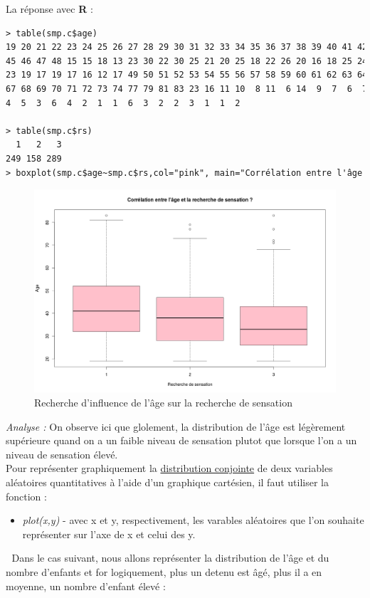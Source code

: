 La réponse avec \textbf{R} : 
\begin{lstlisting}[language=html]
> table(smp.c$age)
19 20 21 22 23 24 25 26 27 28 29 30 31 32 33 34 35 36 37 38 39 40 41 42 43 44 
45 46 47 48 15 15 18 13 23 30 22 30 25 21 20 25 18 22 26 20 16 18 25 24 23 22 
23 19 17 19 17 16 12 17 49 50 51 52 53 54 55 56 57 58 59 60 61 62 63 64 65 66 
67 68 69 70 71 72 73 74 77 79 81 83 23 16 11 10  8 11  6 14  9  7  6  7  5  7  
4  5  3  6  4  2  1  1  6  3  2  2  3  1  1  2 

> table(smp.c$rs)
  1   2   3 
249 158 289 
> boxplot(smp.c$age~smp.c$rs,col="pink", main="Corrélation entre l'âge et la recherche de sensation ?", xlab = "Recherche de sensation", ylab="Age")
\end{lstlisting}
\begin{figure}[H]\begin{center}\includegraphics[scale=0.35]{ilu/tp5.png}\caption{Recherche d'influence de l'âge sur la recherche de sensation}\end{center}\end{figure}
\textit{Analyse :} On observe ici que glolement, la distribution de l'âge est légèrement supérieure quand on a un faible niveau de sensation plutot que lorsque l'on a un niveau de sensation élevé. \newline
\\
Pour représenter graphiquement la \underline{distribution conjointe} de deux variables aléatoires quantitatives à l'aide d'un graphique cartésien, il faut utiliser la fonction : 
\begin{itemize}
\item \textit{plot(x,y)} - avec x et y, respectivement, les varables aléatoires que l'on souhaite représenter sur l'axe de x et celui des y.
\end{itemize}
\textcolor{white}{.}\newline
Dans le cas suivant, nous allons représenter la distribution de l'âge et du nombre d'enfants et for logiquement, plus un detenu est âgé, plus il a en moyenne, un nombre d'enfant élevé :  

